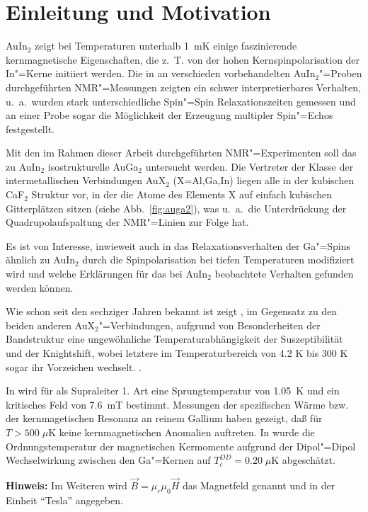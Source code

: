 \chapter*{Einleitung und Motivation}

AuIn$_2$ zeigt bei Temperaturen unterhalb 1~mK einige faszinierende kernmagnetische
Eigenschaften, die z.\ T. von der hohen Kernspinpolarisation der In"=Kerne initiiert 
werden. Die in \cite{Wagner_Dis} an verschieden vorbehandelten AuIn$_2$"=Proben durchgeführten
NMR"=Messungen zeigten ein schwer interpretierbares Verhalten, u.\ a.\ wurden stark
unterschiedliche Spin"=Spin Relaxationszeiten gemessen und an einer Probe sogar die Möglichkeit der Erzeugung
multipler Spin"=Echos festgestellt.

Mit den im Rahmen dieser Arbeit durchgeführten NMR"=Experimenten soll das zu AuIn$_2$ isostrukturelle
AuGa$_2$ untersucht werden. Die Vertreter der Klasse der intermetallischen Verbindungen AuX$_2$
(X=Al,Ga,In) liegen alle in der kubischen CaF$_2$ Struktur vor, in der die Atome des Elements X
auf einfach kubischen Gitterplätzen sitzen (siehe Abb.~\ref{fig:auga2}), was u.\ a.\ die
Unterdrückung der Quad\-ru\-pol\-auf\-spal\-tung der NMR"=Linien zur Folge hat.

Es ist von Interesse, inwieweit auch in \aug{} das Relaxationsverhalten der Ga"=Spins ähnlich zu
AuIn$_2$ durch die Spinpolarisation bei tiefen Temperaturen modifiziert wird und welche 
Erklärungen für das bei AuIn$_2$ beobachtete Verhalten gefunden werden können.

Wie schon seit den sechziger Jahren bekannt ist zeigt \aug, im Gegensatz zu den beiden anderen
AuX$_2$"=Verbindungen, aufgrund von Besonderheiten der Bandstruktur eine ungewöhnliche
Temperaturabhängigkeit der Suszeptibilität und der Knightshift, wobei letztere im
Temperaturbereich von 4.2 K bis 300 K sogar ihr Vorzeichen wechselt. \cite{AuGa2Dilemma}.

In \cite{Stephan_Dis} wird für \aug{} als Supraleiter 1. Art eine Sprungtemperatur von 1.05~K und
ein kritisches Feld von 7.6~mT bestimmt. Messungen der spezifischen Wärme bzw. der
kernmagetischen Resonanz an reinem Gallium haben gezeigt, daß für $T>500\;\mu$K keine
kernmagnetischen Anomalien auftreten. In \cite{Stephan_Dis} wurde die Ordnungstemperatur der
magnetischen Kermomente aufgrund der Dipol"=Dipol Wechselwirkung zwischen den Ga"=Kernen auf
$T_c^{DD}=0.20\;\mu$K abgeschätzt.

{\bfseries Hinweis: }
Im Weiteren wird $\vec B=\mu_r\mu_0\vec H$ das Magnetfeld genannt und in der Einheit "`Tesla"' angegeben.
